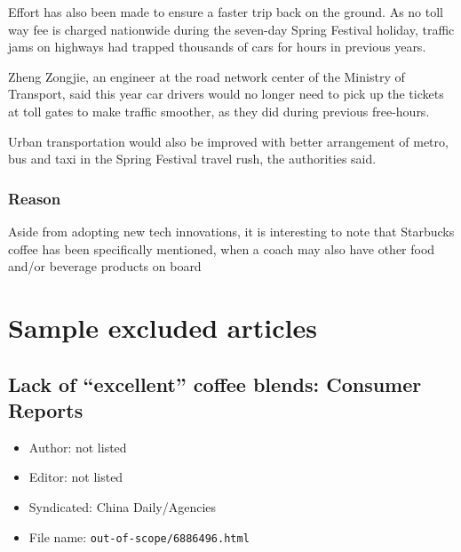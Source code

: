 \begin{displayquote}
	Effort has also been made to ensure a faster trip back on the ground. As
	no toll way fee is charged nationwide during the seven-day Spring
	Festival holiday, traffic jams on highways had trapped thousands of cars
	for hours in previous years.

	Zheng Zongjie, an engineer at the road network center of the Ministry of
	Transport, said this year car drivers would no longer need to pick up
	the tickets at toll gates to make traffic smoother, as they did during
	previous free-hours.

	Urban transportation would also be improved with better arrangement of
	metro, bus and taxi in the Spring Festival travel rush, the authorities
	said.

\end{displayquote}

\subsection{Reason}

Aside from adopting new tech innovations, it is interesting to note that
Starbucks coffee has been specifically mentioned, when a coach may also have
other food and/or beverage products on board

\chapter{Sample excluded articles}\label{appdx:news-articles-ninc}

\section{Lack of ``excellent'' coffee blends: Consumer Reports}

\begin{itemize}
	\item Author: not listed
	\item Editor: not listed
	\item Syndicated: China Daily/Agencies
	\item File name: \texttt{out-of-scope/6886496.html}
\end{itemize}

